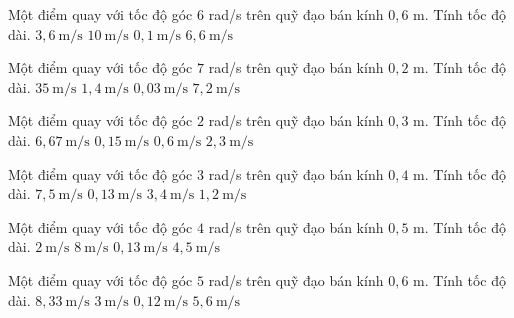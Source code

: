 \begin{ex}
Một điểm quay với tốc độ góc $6$ rad/s trên quỹ đạo bán kính $0,6$ m. Tính tốc độ dài.
\choice
{\True $3,6\ \mathrm{m/s}$}
{$10\ \mathrm{m/s}$}
{$0,1\ \mathrm{m/s}$}
{$6,6\ \mathrm{m/s}$}
\end{ex}

\begin{ex}
Một điểm quay với tốc độ góc $7$ rad/s trên quỹ đạo bán kính $0,2$ m. Tính tốc độ dài.
\choice
{$35\ \mathrm{m/s}$}
{\True $1,4\ \mathrm{m/s}$}
{$0,03\ \mathrm{m/s}$}
{$7,2\ \mathrm{m/s}$}
\end{ex}

\begin{ex}
Một điểm quay với tốc độ góc $2$ rad/s trên quỹ đạo bán kính $0,3$ m. Tính tốc độ dài.
\choice
{$6,67\ \mathrm{m/s}$}
{$0,15\ \mathrm{m/s}$}
{\True $0,6\ \mathrm{m/s}$}
{$2,3\ \mathrm{m/s}$}
\end{ex}

\begin{ex}
Một điểm quay với tốc độ góc $3$ rad/s trên quỹ đạo bán kính $0,4$ m. Tính tốc độ dài.
\choice
{$7,5\ \mathrm{m/s}$}
{$0,13\ \mathrm{m/s}$}
{$3,4\ \mathrm{m/s}$}
{\True $1,2\ \mathrm{m/s}$}
\end{ex}

\begin{ex}
Một điểm quay với tốc độ góc $4$ rad/s trên quỹ đạo bán kính $0,5$ m. Tính tốc độ dài.
\choice
{\True $2\ \mathrm{m/s}$}
{$8\ \mathrm{m/s}$}
{$0,13\ \mathrm{m/s}$}
{$4,5\ \mathrm{m/s}$}
\end{ex}

\begin{ex}
Một điểm quay với tốc độ góc $5$ rad/s trên quỹ đạo bán kính $0,6$ m. Tính tốc độ dài.
\choice
{$8,33\ \mathrm{m/s}$}
{\True $3\ \mathrm{m/s}$}
{$0,12\ \mathrm{m/s}$}
{$5,6\ \mathrm{m/s}$}
\end{ex}

